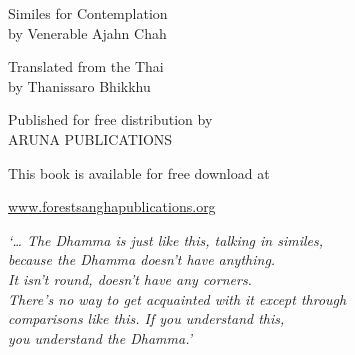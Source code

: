 
{\pagestyle{empty}\enlargethispage{-2\baselineskip}

{\raggedleft\setlength{\parskip}{1em}\setlength{\parindent}{0em}

\vspace*{5\baselineskip}
{\selectfont\titlepagetitlesize\color{textbody} \MakeUppercase{\bookTitle}%
\par\vspace*{\baselineskip}\vspace*{-0.1\baselineskip} { Similes for Contemplation \\
by Venerable Ajahn Chah

Translated from the Thai \\
by Thanissaro Bhikkhu

}}

\vfill

{\selectfont%
Published for free distribution by\\
ARUNA PUBLICATIONS

This book is available for free download at

\vspace*{-0.8\baselineskip}%
{\titlepagelinksize\href{http://www.forestsanghapublications.org/}{www.forestsanghapublications.org}}%

}

}

\mbox{}\newpage\thispagestyle{empty}%


\cleardoublepage

\mbox{}\vspace*{-\headsep}\vspace*{-1.5\baselineskip}

\noindent%
\begin{minipage}[c][\textheight][c]{\paperwidth}

\noindent\hspace*{-20mm}%
\begin{minipage}{\paperwidth}
\centering

{\itshape `\ldots{} The Dhamma is just like this, talking in similes,\\
because the Dhamma doesn't have anything.\\
It isn't round, doesn't have any corners.\\
There's no way to get acquainted with it except through\\
comparisons like this. If you understand this,\\
you understand the Dhamma.'
\bigskip

}
\end{minipage}
\end{minipage}}
